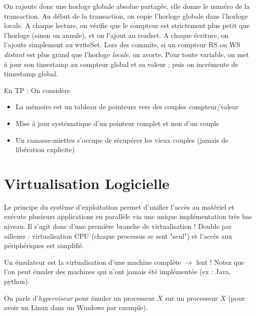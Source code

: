 \documentclass{article}
\begin{document}
On rajoute donc une horloge globale absolue partagée, elle donne le numéro de la transaction. Au début de la transaction, on copie l'horloge globale dans l'horloge locale.
A chaque lecture, on vérifie que le compteur est strictement plus petit que l'horloge (sinon on annule), et on l'ajout au readset. A chaque écriture, on l'ajoute simplement au writeSet.
Lors des commits, si un compteur RS ou WS \emph{distant} est plus grand que l'horloge \emph{locale}, on avorte. Pour toute variable, on met à jour son timestamp au compteur global et sa valeur ; puis on incrémente de timestamp global.
\bigskip

En TP : On considère
\begin{itemize}
\item La mémoire est un tableau de pointeurs vers des couples compteur/valeur
\item Mise à jour systématique d'un pointeur complet et non d'un couple
\item Un ramasse-miettes s'occupe de récupérer les vieux couples (jamais de libération explicite)
\end{itemize}

\section{Virtualisation Logicielle}
Le principe du système d'exploitation permet d'unifier l'accès au matériel et exécute plusieurs applications en parallèle via une unique implémentation très bas niveau. Il s'agit donc d'une première branche de virtualisation ! Double par ailleurs : virtualisation CPU (chaque processus se sent "seul") et l'accès aux périphériques est simplifié.

Un émulateur est la virtualisation d'une machine complète $\to$ lent ! Notez que l'on peut émuler des machines qui n'ont jamais été implémentée (ex : Java, python).

On parle d'\emph{hyperviseur} pour émuler un processeur $X$ sur un processeur $X$ (pour avoir un Linux dans un Windows par exemple).
\end{document}
